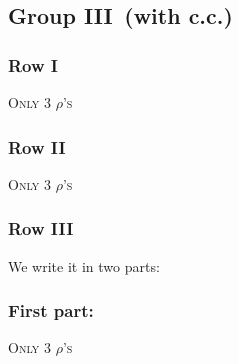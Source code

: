 \documentclass[9pt]{article}
\numberwithin{equation}{section}
\begin{document}
\subsection{Group III\, (with c.c.)}
\subsubsection{Row I}
\textsc{Only 3 $\rho$'s}
\subsubsection{Row II}
\textsc{Only 3 $\rho$'s}
\subsubsection{Row III}
We write it in two parts:
\subsubsection{First part:}
\textsc{Only 3 $\rho$'s}
\end{document}
